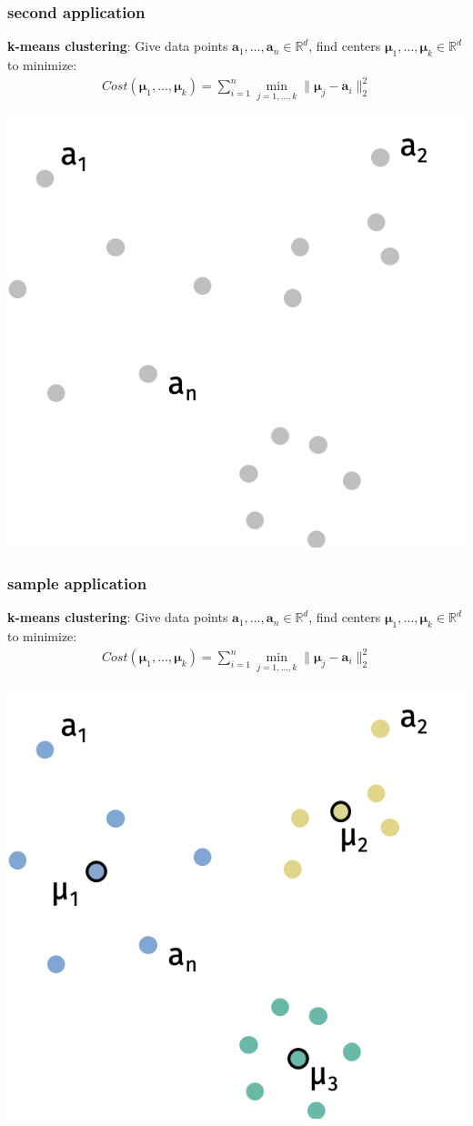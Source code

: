 \documentclass[compress]{beamer}
\newcommand{\bs}[1]{\boldsymbol{#1}}
\newcommand{\bv}[1]{\mathbf{#1}}
\newcommand{\R}{\mathbb{R}}
\begin{document}
\begin{frame}[t]
	\frametitle{second application}
	\textbf{k-means clustering}: Give data points $\bv{a}_1,\ldots, \bv{a}_n \in \R^d$, find centers $\bs{\mu}_1, \ldots, \bs{\mu}_k\in \R^d$ to minimize:
	\begin{align*}
		Cost(\bs{\mu}_1,\ldots, \bs{\mu}_k) = \sum_{i=1}^n \min_{j = 1,\ldots,k} \|\bs{\mu}_j - \bv{a}_i\|_2^2
	\end{align*}
	\begin{center}
		\includegraphics[width=.5\textwidth]{kmeans1.png}
	\end{center}
\end{frame}
\begin{frame}[t]
	\frametitle{sample application}
	\textbf{k-means clustering}: Give data points $\bv{a}_1,\ldots, \bv{a}_n \in \R^d$, find centers $\bs{\mu}_1, \ldots, \bs{\mu}_k\in \R^d$ to minimize:
	\begin{align*}
		Cost(\bs{\mu}_1,\ldots, \bs{\mu}_k) = \sum_{i=1}^n \min_{j = 1,\ldots,k} \|\bs{\mu}_j - \bv{a}_i\|_2^2
	\end{align*}
	\begin{center}
		\includegraphics[width=.5\textwidth]{kmeans2.png}
	\end{center}
\end{frame}
\end{document}
